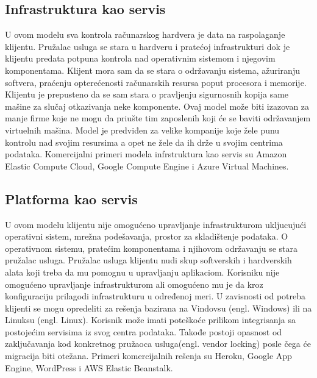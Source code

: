 \documentclass[12pt,oneside]{memoir}
\begin{document}
\subsection{Infrastruktura kao servis}

U ovom modelu sva kontrola računarskog hardvera je data na raspolaganje klijentu. Pružalac usluga se stara u hardveru i pratećoj infrastrukturi dok je klijentu predata potpuna kontrola nad operativnim sistemom i njegovim komponentama. Klijent mora sam da se stara o održavanju sistema, ažuriranju softvera, praćenju opterećenosti računarskih resursa poput procesora i memorije. Klijentu je prepusteno da se sam stara o pravljenju sigurnosnih kopija same mašine za slučaj otkazivanja neke komponente. Ovaj model može biti izazovan za manje firme koje ne mogu da priušte tim zaposlenih koji će se baviti održavanjem virtuelnih mašina. Model je predviđen za velike kompanije koje žele punu kontrolu nad svojim resursima a opet ne žele da ih drže u svojim centrima podataka\cite{cc}. Komercijalni primeri modela infrstruktura kao servis su Amazon Elastic Compute Cloud, Google Compute Engine i Azure Virtual Machines. %

 
\subsection{Platforma kao servis}
U ovom modelu klijentu nije omogućeno upravljanje infrastrukturom ukljucujući operativni sistem, mrežna podešavanja, prostor za skladištenje podataka. O operativnom sistemu, pratećim komponentama i njihovom održavanju se stara pružalac usluga. Pružalac usluga klijentu nudi skup softverskih i hardverskih alata koji treba da mu pomognu u upravljanju aplikaciom. Korisniku nije omogućeno upravljanje infrastrukturom ali omogućeno mu je da kroz konfiguraciju prilagodi infrastrukturu u određenoj meri. U zavisnosti od potreba klijenti se mogu opredeliti za rešenja bazirana na Vindovsu (engl. Windows) ili na Linuksu (engl. Linux). Korisnik može imati poteškoće prilikom integrisanja sa postojećim servisima iz svog centra podataka. Takođe postoji opasnost od zaključavanja kod konkretnog pružaoca usluga(engl. vendor locking) posle čega će migracija biti otežana\cite{cc}. Primeri komercijalnih rešenja su Heroku, Google App Engine, WordPress i AWS Elastic Beanstalk. %
\end{document}
